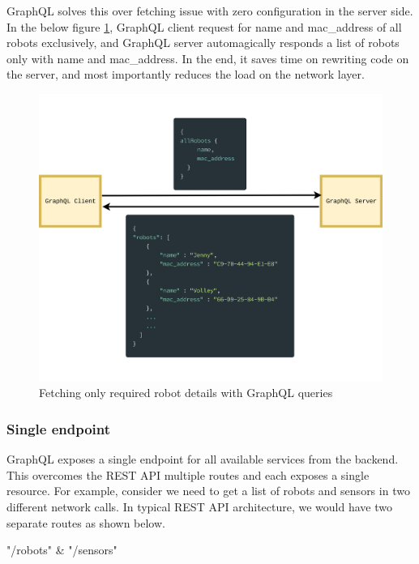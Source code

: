 	GraphQL solves this over fetching issue with zero configuration in the server side. In the below figure \ref{fig:graphql_declarative}, GraphQL client request for name and mac\_address of all robots exclusively, and GraphQL server automagically responds a list of robots only with name and mac\_address. In the end, it saves time on rewriting code on the server, and most importantly reduces the load on the network layer.
	\newpage
	\begin{figure}[!htbp] 
		\begin{center}
			\includegraphics[trim={0 0 0 2cm},clip,scale=0.07]{./images/png/graphql_declarative}	
			\caption{Fetching only required robot details with GraphQL queries}	
			\label{fig:graphql_declarative}	
		\end{center}
	\end{figure}

	\subsubsection{Single endpoint}
	
	GraphQL exposes a single endpoint for all available services from the backend. This overcomes the REST API multiple routes and each exposes a single resource. For example, consider we need to get a list of robots and sensors in two different network calls. In typical REST API architecture, we would have two separate routes as shown below.
	
	"/robots" \& "/sensors"
	
